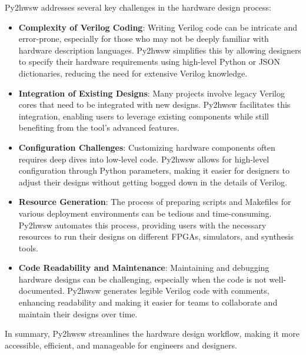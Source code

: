 %

Py2hwsw addresses several key challenges in the hardware design process:
\begin{itemize}
    \item \textbf{Complexity of Verilog Coding}: Writing Verilog code can be intricate and error-prone, especially for those who may not be deeply familiar with hardware description languages. Py2hwsw simplifies this by allowing designers to specify their hardware requirements using high-level Python or JSON dictionaries, reducing the need for extensive Verilog knowledge.

    \item \textbf{Integration of Existing Designs}: Many projects involve legacy Verilog cores that need to be integrated with new designs. Py2hwsw facilitates this integration, enabling users to leverage existing components while still benefiting from the tool's advanced features.

    \item \textbf{Configuration Challenges}: Customizing hardware components often requires deep dives into low-level code. Py2hwsw allows for high-level configuration through Python parameters, making it easier for designers to adjust their designs without getting bogged down in the details of Verilog.

    \item \textbf{Resource Generation}: The process of preparing scripts and Makefiles for various deployment environments can be tedious and time-consuming. Py2hwsw automates this process, providing users with the necessary resources to run their designs on different FPGAs, simulators, and synthesis tools.

    \item \textbf{Code Readability and Maintenance}: Maintaining and debugging hardware designs can be challenging, especially when the code is not well-documented. Py2hwsw generates legible Verilog code with comments, enhancing readability and making it easier for teams to collaborate and maintain their designs over time.
\end{itemize}

In summary, Py2hwsw streamlines the hardware design workflow, making it more accessible, efficient, and manageable for engineers and designers.
